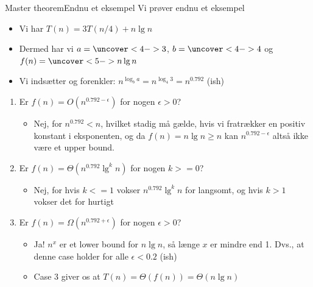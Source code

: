 \documentclass[aspectratio=1610]{beamer}
\begin{document}
\begin{frame}{Master theorem}{Endnu et eksempel}
    Vi prøver endnu et eksempel

    \begin{itemize}
        \item<2-> Vi har $T(n) = 3T(n/4) + n \lg n$
        \item<3-> Dermed har vi $a = \uncover<4->{3}$, $b=\uncover<4->{4}$ og
            $f(n)=\uncover<5->{n \lg n}$
        \item<6-> Vi indsætter og forenkler: $n^{\log_b a} = n^{\log_4 3} =
            n^{0.792}$ (ish)
    \end{itemize}

    \begin{enumerate}
        \item<7-> Er $f(n) = O(n^{0.792 - \epsilon})$ for nogen $\epsilon > 0$?
            \begin{itemize}
                \item<8-> Nej, for $n^{0.792} < n$, hvilket stadig må gælde,
                    hvis vi fratrækker en positiv konstant i eksponenten, og da
                    $f(n) = n \lg n \geq n$ kan $n^{0.792 - \epsilon}$ altså
                    ikke være et upper bound.
            \end{itemize}
        \item<9-> Er $f(n) = \Theta(n^{0.792}\lg^k n)$ for nogen $k >= 0$?
            \begin{itemize}
                \item<10-> Nej, for hvis $k <= 1$ vokser $n^{0.792}\lg^{k}n$ for
                    langsomt, og hvis $k > 1$ vokser det for hurtigt
            \end{itemize}
        \item<11-> Er $f(n) = \Omega(n^{0.792 + \epsilon})$ for nogen $\epsilon > 0$?
            \begin{itemize}
                \item<12-> Ja! $n^{x}$ er et lower bound for $n\lg n$, så længe $x$
                    er mindre end 1. Dvs., at denne case holder for alle
                    $\epsilon < 0.2$ (ish)
                \item<12-> \alert{Case 3} giver os at $T(n) = \Theta(f(n)) =
                    \Theta(n \lg n)$
            \end{itemize}
    \end{enumerate}
\end{frame}
\end{document}
